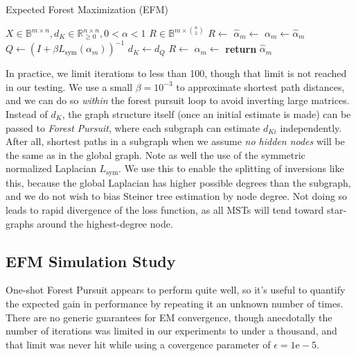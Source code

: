 \documentclass[%
	12pt,
		oneside,
		letterpaper
]{book}
\begin{document}
\begin{algorithm}[htb!]
\caption{Expected Forest Maximization (EFM)}
\label{alg-efm}
\begin{algorithmic}[1]
\Require $X\in \mathbb{B}^{m\times n}, d_K\in \mathbb{R}_{\geq 0}^{n\times n}, 0<\alpha<1$
\Ensure $R \in \mathbb{B}^{m \times {n\choose 2}}$
  \State $R \gets $
    \State $\hat{\alpha}_m\gets$
    \While {$\|\hat{\alpha}-\alpha\|_{\infty}>\epsilon$}
        \State $\alpha_m \gets \hat{\alpha}_m$
        \State $Q \gets (I+\beta L_{\text{sym}}(\alpha_m))^{-1}$
        \State $d_K \gets d_Q$
        \State $R \gets $
        \State $\hat{\alpha}_m\gets$
    \EndWhile
  \State \textbf{return} $\hat{\alpha}_m$
\EndProcedure
\end{algorithmic}
\end{algorithm}

In practice, we limit iterations to less than 100, though that limit is
not reached in our testing. We use a small \(\beta=10^{-3}\) to
approximate shortest path distances, and we can do so \emph{within} the
forest pursuit loop to avoid inverting large matrices. Instead of
\(d_K\), the graph structure itself (once an initial estimate is made)
can be passed to \emph{Forest Pursuit}, where each subgraph can estimate
\(d_{Ki}\) independently. After all, shortest paths in a subgraph when
we assume \emph{no hidden nodes} will be the same as in the global
graph. Note as well the use of the symmetric normalized Laplacian
\(L_{\text{sym}}\). We use this to enable the splitting of inversions
like this, because the global Laplacian has higher possible degrees than
the subgraph, and we do not wish to bias Steiner tree estimation by node
degree. Not doing so leads to rapid divergence of the loss function, as
all MSTs will tend toward star-graphs around the highest-degree node.

\subsection{EFM Simulation Study}\label{efm-simulation-study}

One-shot Forest Pursuit appears to perform quite well, so it's useful to
quantify the expected gain in performance by repeating it an unknown
number of times. There are no generic guarantees for EM convergence,
though anecdotally the number of iterations was limited in our
experiments to under a thousand, and that limit was never hit while
using a covergence parameter of \(\epsilon=1\mathrm{e}-5\).
\end{document}
